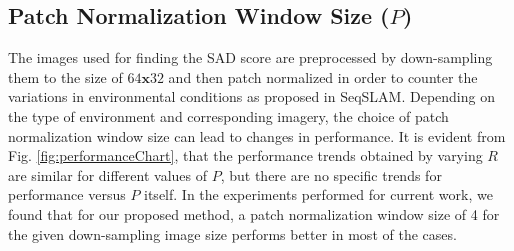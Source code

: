 \documentclass[letterpaper, 10 pt, conference]{ieeeconf}  %
\begin{document}
\subsection{Patch Normalization Window Size ($P$)}
The images used for finding the SAD score are preprocessed by down-sampling them to the size of $64\mathbf{x}32$ and then patch normalized in order to counter the variations in environmental conditions as proposed in SeqSLAM. Depending on the type of environment and corresponding imagery, the choice of patch normalization window size can lead to changes in performance. It is evident from Fig. \ref{fig:performanceChart}, that the performance trends obtained by varying $R$ are similar for different values of $P$, but there are no specific trends for performance versus $P$ itself. In the experiments performed for current work, we found that for our proposed method, a patch normalization window size of 4 for the given down-sampling image size performs better in most of the cases.

\end{document}
